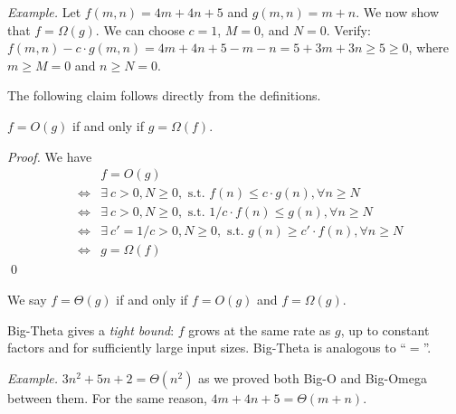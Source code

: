 
\emph{Example.} Let $f(m,n) = 4m + 4n + 5$ and $g(m,n) = m + n$. We now show that $f = \Omega(g)$.
We can choose $c = 1$, $M = 0$, and $N = 0$.
Verify: $f(m,n) - c\cdot g(m,n) = 4m + 4n + 5 - m - n = 5 + 3m + 3n \ge 5 \ge 0$,
where $m \ge M = 0$ and $n \ge N = 0$.

The following claim follows directly from the definitions.
\begin{claim}
$f = O(g)$ if and only if $g = \Omega(f)$.
\end{claim}
\emph{Proof.} We have
		\begin{displaymath}
		\begin{array}{llll}
		& & f = O(g) \\
		& \Leftrightarrow & \exists\ c > 0, N \ge 0, \textrm{ s.t.\ } f(n) \le c\cdot g(n), \forall n \ge N\\
		& \Leftrightarrow & \exists\ c > 0, N \ge 0, \textrm{ s.t.\ } 1/c \cdot f(n) \le g(n), \forall n \ge N\\
		& \Leftrightarrow & \exists\ c' = 1/c > 0, N \ge 0, \textrm{ s.t.\ } g(n) \ge c'\cdot f(n), \forall n \ge N\\
		& \Leftrightarrow & g = \Omega(f) 
		\end{array}
		\end{displaymath} \qed

\begin{definition}
We say $f = \Theta(g)$ if and only if $f = O(g)$ and $f = \Omega(g)$.
\end{definition}

Big-Theta gives a \emph{tight bound}: $f$ grows at the same rate as $g$,
up to constant factors and for sufficiently large input sizes.
Big-Theta is analogous to ``$=$''.

%

\emph{Example.}
$3n^2 + 5n + 2 = \Theta(n^2)$ as we proved both Big-O and Big-Omega between them.
For the same reason, $4m + 4n + 5 = \Theta(m + n)$.



